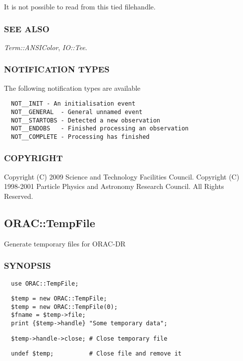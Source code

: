 \begin{description}
\begin{description}
It is not possible to read from this tied filehandle.

\subsubsection*{SEE ALSO\label{ORAC::Print_SEE_ALSO}}


\emph{Term::ANSIColor}, \emph{IO::Tee}.

\subsubsection*{NOTIFICATION TYPES\label{ORAC::Print_NOTIFICATION_TYPES}}


The following notification types are available

\begin{verbatim}
  NOT__INIT - An initialisation event
  NOT__GENERAL  - General unnamed event
  NOT__STARTOBS - Detected a new observation
  NOT__ENDOBS   - Finished processing an observation
  NOT__COMPLETE - Processing has finished
\end{verbatim}
\subsubsection*{COPYRIGHT\label{ORAC::Print_COPYRIGHT}}


Copyright (C) 2009 Science and Technology Facilities Council.
Copyright (C) 1998-2001 Particle Physics and Astronomy Research
Council. All Rights Reserved.

\subsection{ORAC::TempFile\label{ORAC::TempFile}}


Generate temporary files for ORAC-DR

\subsubsection*{SYNOPSIS\label{ORAC::TempFile_SYNOPSIS}}
\begin{verbatim}
  use ORAC::TempFile;
\end{verbatim}
\begin{verbatim}
  $temp = new ORAC::TempFile;
  $temp = new ORAC::TempFile(0);
  $fname = $temp->file;
  print {$temp->handle} "Some temporary data";
\end{verbatim}
\begin{verbatim}
  $temp->handle->close; # Close temporary file
\end{verbatim}
\begin{verbatim}
  undef $temp;          # Close file and remove it
\end{verbatim}

\end{description}
\end{description}
